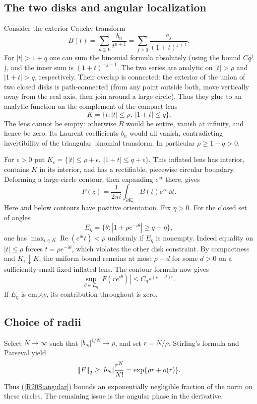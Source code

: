 \documentclass[11pt,a4paper]{article}
\begin{document}
\subsection{The two disks and angular localization}
Consider the exterior Cauchy transform
\[
 B(t)=\sum_{n\ge0}\frac{b_n}{t^{n+1}}
      =\sum_{j\ge0}\frac{a_j}{(1+t)^{j+1}}.
\]
For $|t|>1+q$ one can sum the binomial formula absolutely (using the bound $Cq^j$), and the inner sum is $(1+t)^{-j-1}$. The two series are analytic on $|t|>\rho$ and $|1+t|>q$, respectively. Their overlap is connected: the exterior of the union of two closed disks is path-connected (from any point outside both, move vertically away from the real axis, then join around a large circle). Thus they glue to an analytic function on the complement of the compact lens
\[
 K=\{t:|t|\le\rho,\ |1+t|\le q\}.
\]
The lens cannot be empty: otherwise $B$ would be entire, vanish at infinity, and hence be zero. Its Laurent coefficients $b_n$ would all vanish, contradicting invertibility of the triangular binomial transform. In particular $\rho\ge 1-q>0$.

For $\epsilon>0$ put $K_\epsilon=\{|t|\le\rho+\epsilon,\ |1+t|\le q+\epsilon\}$. This inflated lens has interior, contains $K$ in its interior, and has a rectifiable, piecewise circular boundary. Deforming a large-circle contour, then expanding $e^{zt}$ there, gives
\[
 F(z)=\frac{1}{2\pi i}\int_{\partial K_\epsilon}B(t)e^{zt}\,\dd t.
\]
Here and below contours have positive orientation. Fix $\eta>0$. For the closed set of angles
\[
 E_\eta=\{\theta:|1+\rho e^{-i\theta}|\ge q+\eta\},
\]
one has $\max_{t\in K}\operatorname{Re}(e^{i\theta}t)<\rho$ uniformly if $E_\eta$ is nonempty. Indeed equality on $|t|\le\rho$ forces $t=\rho e^{-i\theta}$, which violates the other disk constraint. By compactness and $K_\epsilon\downarrow K$, the uniform bound remains at most $\rho-d$ for some $d>0$ on a sufficiently small fixed inflated lens. The contour formula now gives
\begin{equation}\label{R20S:angular}
 \sup_{\theta\in E_\eta}|F(re^{i\theta})|\le C_\eta e^{(\rho-d)r}.
\end{equation}
If $E_\eta$ is empty, its contribution throughout is zero.

\subsection{Choice of radii}
Select $N\to\infty$ such that $|b_N|^{1/N}\to\rho$, and set $r=N/\rho$. Stirling's formula and Parseval yield
\begin{equation}\label{R20S:peak}
 \left\|F\right\|_2\ge |b_N|\frac{r^N}{N!}=\exp\{\rho r+o(r)\}.
\end{equation}
Thus (\ref{R20S:angular}) bounds an exponentially negligible fraction of the norm on these circles. The remaining issue is the angular phase in the derivative.
\end{document}
